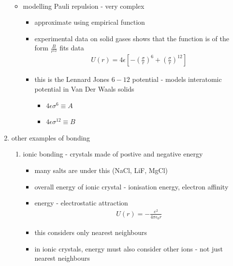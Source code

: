 \documentclass[a4paper,11pt,normalem]{article}
\begin{document}
\begin{enumerate}
\begin{itemize}
\begin{itemize}
\begin{align*}
                        \end{align*}
                \end{itemize}
            \item modelling Pauli repulsion - very complex
                \begin{itemize}
                    \item approximate using empirical function
                    \item experimental data on solid gases shows that the function is of the form \(\frac{B}{r^{12}}\) fits data
                        \begin{align*}
                            U(r) = 4\epsilon\left[-\left(\frac{\sigma}{r}\right)^6 + \left(\frac{\sigma}{r}\right)^{12}\right]
                        \end{align*}
                    \item this is the Lennard Jones \(6-12\) potential - models interatomic potential in Van Der Waals solids
                        \begin{itemize}
                            \item \(4\epsilon\sigma^6 \equiv A\)
                            \item \(4\epsilon\sigma^{12} \equiv B\)
                        \end{itemize}
                \end{itemize}
        \end{itemize}
    \item other examples of bonding
        \begin{enumerate}
            \item ionic bonding - crystals made of postive and negative energy
                \begin{itemize}
                    \item many salts are under this (NaCl, LiF, MgCl)
                    \item overall energy of ionic crystal - ionisation energy, electron affinity
                    \item energy - electrostatic attraction
                        \begin{align*}
                            U(r) = -\frac{e^2}{4\pi\epsilon_0 r}
                        \end{align*}
                    \item this considers only nearest neighbours
                    \item in ionic crystals, energy must also consider other ions - not just nearest neighbours

\end{itemize}
\end{enumerate}
\end{enumerate}
\end{document}
